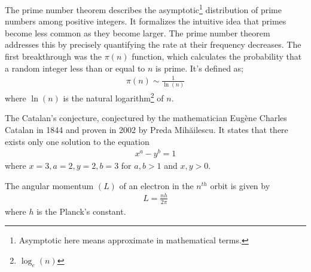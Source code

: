 \begin{mathbox}{}
{The prime number theorem describes the asymptotic\footnote{Asymptotic here means approximate in mathematical terms.} distribution of prime numbers among positive integers. It formalizes the intuitive idea that primes become less common as they become larger. The prime number theorem addresses this by precisely quantifying the rate at their frequency decreases. The first breakthrough was the $\pi(n)$ function, which calculates the probability that a random integer less than or equal to $n$ is prime. It's defined as;
\begin{align*}
    \pi(n) \sim \frac{1}{\ln(n)}
\end{align*}
where $\ln (n)$ is the natural logarithm\footnote{$\log_e(n)$} of $n$.
\begin{flushleft}
\end{flushleft}}
\end{mathbox}
\begin{mathbox}{}
{The Catalan's conjecture, conjectured by the mathematician Eugène Charles Catalan in 1844 and proven in 2002 by Preda Mihăilescu. It states that there  exists only one solution to the equation
\begin{align*} 
    x^a - y^b = 1
\end{align*} 
where $x=3, a=2, y=2, b=3$ for {$a,b > 1$} and {$x,y > 0$}.}
\end{mathbox}
\begin{phybox}{}
{The {angular momentum} $(L)$ of an {electron} in the $n^{th}$ orbit is given by 
\begin{align*} 
    L = \frac{nh}{2\pi} 
\end{align*} where $h$ is the {Planck's constant}.}
\end{phybox}
